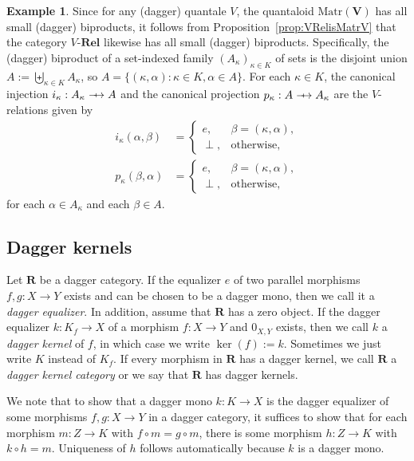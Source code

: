 \documentclass[12pt]{tac}
\theoremstyle{definition}
\newtheorem{example}[theorem]{Example}
\theoremstyle{remark}
\newcommand{\<}{\langle}
\renewcommand{\>}{\rangle}
\renewcommand{\:}{\colon}
\def\sto{\relbar\joinrel\mapstochar\joinrel\rightarrow}
\begin{document}
\begin{example} \label{ex:biproducts in V-Rel}
Since for any (dagger) quantale $V$, the quantaloid $\mathrm{Matr}(\mathbf V)$ has all small (dagger) biproducts, it follows from Proposition~\ref{prop:VRelisMatrV} that the category $V$-$\mathbf{Rel}$ likewise has all small (dagger) biproducts. Specifically, 
the (dagger) biproduct of a set-indexed family $(A_\kappa)_{\kappa\in K}$ of sets is the disjoint union $A:=\biguplus_{\kappa\in K}A_\kappa$, so $A=\{(\kappa,\alpha):\kappa\in K, \alpha\in A\}$. For each $\kappa\in K$, the canonical injection $i_\kappa:A_\kappa\sto A$ and the canonical projection $p_\kappa:A\sto A_\kappa$ are the $V$-relations given by
    \begin{align*}
    i_\kappa(\alpha,\beta) & = \begin{cases} e, & \beta=(\kappa,\alpha),\\
    \perp, & \textrm{otherwise},
    \end{cases}\\
    p_\kappa(\beta,\alpha) &  =  \begin{cases} e, & \beta=(\kappa,\alpha),\\
    \perp, & \textrm{otherwise},
    \end{cases}
        \end{align*}
        for each $\alpha\in A_\kappa$ and each $\beta\in A$.    
        \end{example}


\subsection{Dagger kernels}\label{sec:dagger kernel}
 Let $\mathbf R$ be a dagger category. If the equalizer $e$ of two parallel morphisms $f,g:X\to Y$ exists and can be chosen to be a dagger mono, then we call it a \emph{dagger equalizer}. In addition, assume that $\mathbf R$ has a zero object. If the dagger equalizer $k:K_f\to X$ of a morphism  $f:X\to Y$ and $0_{X,Y}$ exists, then we call $k$ a \emph{dagger kernel} of $f$, in which case we write $\ker(f):=k$. Sometimes we just write $K$ instead of $K_f$. If every morphism in $\mathbf R$ has a dagger kernel, we call $\mathbf R$ a \emph{dagger kernel category} or we say that $\mathbf R$ has dagger kernels. 

We note that to show that a dagger mono $k:K\to X$ is the dagger equalizer of some morphisms $f,g:X\to Y$ in a dagger category, it suffices to show that for each morphism $m:Z\to K$ with $f\circ m=g\circ m$, there is some morphism $h:Z\to K$ with $k\circ h=m$. Uniqueness of $h$ follows automatically because $k$ is a dagger mono. 
\end{document}

